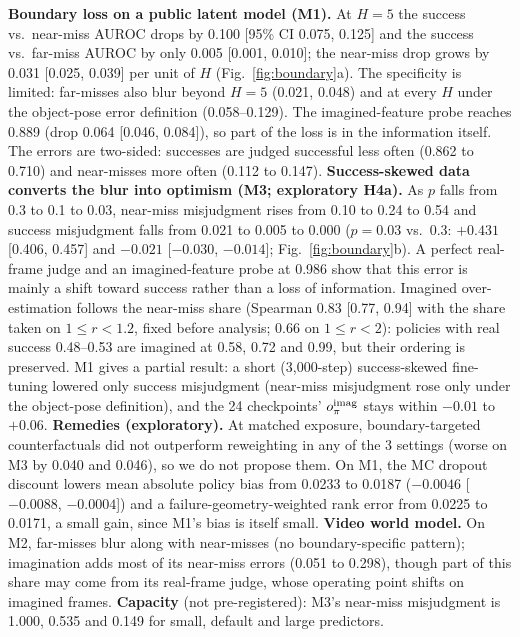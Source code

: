\documentclass[nouppercase]{kaia}
\begin{document}
\begin{mdframed}
\textbf{Boundary loss on a public latent model (M1).} At $H=5$ the success vs.\ near-miss AUROC drops by 0.100 [95\% CI 0.075, 0.125] and the success vs.\ far-miss AUROC by only 0.005 [0.001, 0.010]; the near-miss drop grows by 0.031 [0.025, 0.039] per unit of $H$ (Fig.~\ref{fig:boundary}a). The specificity is limited: far-misses also blur beyond $H=5$ (0.021, 0.048) and at every $H$ under the object-pose error definition (0.058--0.129). The imagined-feature probe reaches 0.889 (drop 0.064 [0.046, 0.084]), so part of the loss is in the information itself. The errors are two-sided: successes are judged successful less often (0.862 to 0.710) and near-misses more often (0.112 to 0.147).
\textbf{Success-skewed data converts the blur into optimism (M3; exploratory H4a).} As $p$ falls from 0.3 to 0.1 to 0.03, near-miss misjudgment rises from 0.10 to 0.24 to 0.54 and success misjudgment falls from 0.021 to 0.005 to 0.000 ($p=0.03$ vs.\ 0.3: $+0.431$ [0.406, 0.457] and $-0.021$ [$-0.030$, $-0.014$]; Fig.~\ref{fig:boundary}b). A perfect real-frame judge and an imagined-feature probe at 0.986 show that this error is mainly a shift toward success rather than a loss of information. Imagined over-estimation follows the near-miss share (Spearman 0.83 [0.77, 0.94] with the share taken on $1\le r<1.2$, fixed before analysis; 0.66 on $1\le r<2$): policies with real success 0.48--0.53 are imagined at 0.58, 0.72 and 0.99, but their ordering is preserved. M1 gives a partial result: a short (3,000-step) success-skewed fine-tuning lowered only success misjudgment (near-miss misjudgment rose only under the object-pose definition), and the 24 checkpoints' $o^{\rm imag}_\pi$ stays within $-0.01$ to $+0.06$.
\textbf{Remedies (exploratory).} At matched exposure, boundary-targeted counterfactuals did not outperform reweighting in any of the 3 settings (worse on M3 by 0.040 and 0.046), so we do not propose them. On M1, the MC dropout discount lowers mean absolute policy bias from 0.0233 to 0.0187 ($-0.0046$ [$-0.0088$, $-0.0004$]) and a failure-geometry-weighted rank error from 0.0225 to 0.0171, a small gain, since M1's bias is itself small.
\textbf{Video world model.} On M2, far-misses blur along with near-misses (no boundary-specific pattern); imagination adds most of its near-miss errors (0.051 to 0.298), though part of this share may come from its real-frame judge, whose operating point shifts on imagined frames. \textbf{Capacity} (not pre-registered): M3's near-miss misjudgment is 1.000, 0.535 and 0.149 for small, default and large predictors.

\par\vspace{1pt}

\end{mdframed}
\end{document}
